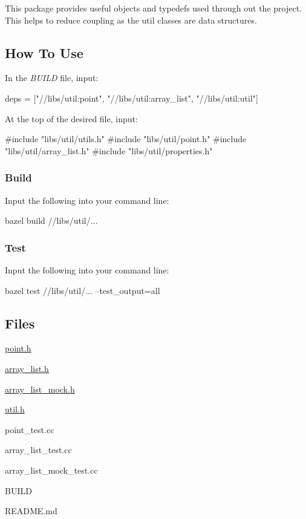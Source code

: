 This package provides useful objects and typedefs used through out the project. This helps to reduce coupling as the util classes are data structures.

\subsection*{How To Use}

In the {\itshape B\+U\+I\+LD} file, input\+: 
\begin{DoxyCode}
deps = ["//libs/util:point", "//libs/util:array\_list", "//libs/util:util"]
\end{DoxyCode}
 At the top of the desired file, input\+: 
\begin{DoxyCode}
#include "libs/util/utils.h"
#include "libs/util/point.h"
#include "libs/util/array\_list.h"
#include "libs/util/properties.h"
\end{DoxyCode}


\subsubsection*{Build}

Input the following into your command line\+: 
\begin{DoxyCode}
bazel build //libs/util/...
\end{DoxyCode}


\subsubsection*{Test}

Input the following into your command line\+: 
\begin{DoxyCode}
bazel test //libs/util/... --test\_output=all
\end{DoxyCode}


\subsection*{Files}


\begin{DoxyItemize}
\item \hyperlink{point_8h}{point.\+h}
\item \hyperlink{array__list_8h}{array\+\_\+list.\+h}
\item \hyperlink{array__list__mock_8h}{array\+\_\+list\+\_\+mock.\+h}
\item \hyperlink{util_8h}{util.\+h} ~\newline
~\newline

\item point\+\_\+test.\+cc
\item array\+\_\+list\+\_\+test.\+cc
\item array\+\_\+list\+\_\+mock\+\_\+test.\+cc ~\newline
~\newline

\item B\+U\+I\+LD
\item R\+E\+A\+D\+M\+E.\+md
\end{DoxyItemize}

